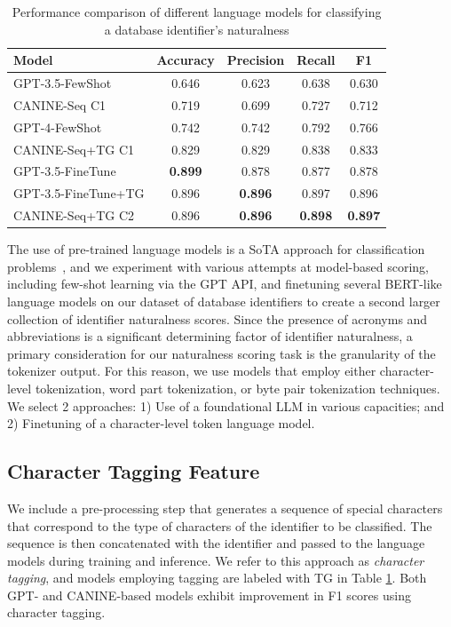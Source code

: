 \begin{table}[t]
  \centering
  \caption{Performance comparison of different language models for classifying a database identifier's naturalness}
  \begin{tabular}{p{4cm}|cccc}
  \toprule
  \textbf{Model} & \textbf{Accuracy} & \textbf{Precision} & \textbf{Recall} & \textbf{F1} \\
  \midrule
  GPT-3.5-FewShot & 0.646 & 0.623 & 0.638 & 0.630 \\
  CANINE-Seq C1 & 0.719 & 0.699 & 0.727 & 0.712 \\
  GPT-4-FewShot & 0.742 & 0.742 & 0.792 & 0.766 \\
  CANINE-Seq+TG C1 & 0.829 & 0.829 & 0.838 & 0.833 \\
  GPT-3.5-FineTune & \textbf{0.899} & 0.878 & 0.877 & 0.878 \\
  GPT-3.5-FineTune+TG & 0.896 & \textbf{0.896} & 0.897 & 0.896 \\
  CANINE-Seq+TG C2 & 0.896 & \textbf{0.896} & \textbf{0.898} & \textbf{0.897} \\
  \bottomrule
  \end{tabular}
  \label{table:classifierperformance}
\end{table}

The use of pre-trained language models is a SoTA approach for classification problems~\cite{10.1145/3605943}, and we experiment with various attempts at model-based scoring, including few-shot learning via the GPT API, and finetuning several BERT-like language models on our dataset of database identifiers to create a second larger collection of identifier naturalness scores. 
Since the presence of acronyms and abbreviations is a significant determining factor of identifier naturalness, a primary consideration for our naturalness scoring task is the granularity of the tokenizer output.
For this reason, we use models that employ either character-level tokenization, word part tokenization, or byte pair tokenization techniques.
We select 2 approaches: 1) Use of a foundational LLM in various capacities; and 2) Finetuning of a character-level token language model.

\subsection{Character Tagging Feature}
We include a pre-processing step that generates a sequence of special characters that correspond to the type of characters of the identifier to be classified. 
The sequence is then concatenated with the identifier and passed to the language models during training and inference.
We refer to this approach as \emph{character tagging}, and models employing tagging are labeled with TG in Table \ref{table:classifierperformance}.
Both GPT- and CANINE-based models exhibit improvement in F1 scores using character tagging.

